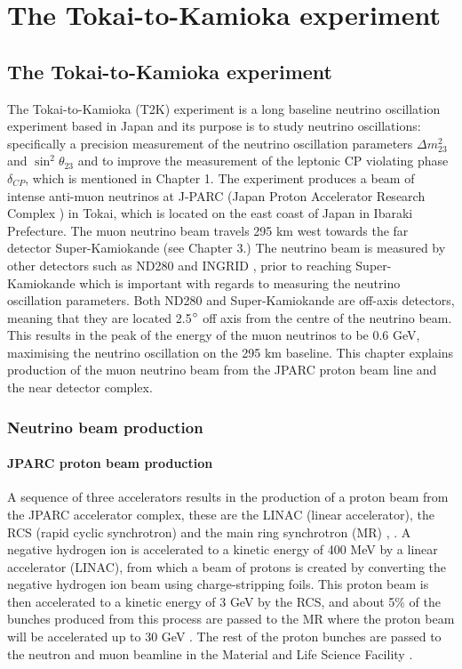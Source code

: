 \chapter{The Tokai-to-Kamioka experiment}
\label{chp:t2kdetector}

\section{The Tokai-to-Kamioka experiment}
The Tokai-to-Kamioka (T2K) experiment \cite{KANEYUKI2005178} is a long baseline neutrino oscillation experiment based in Japan and its purpose is to study neutrino oscillations: specifically a precision measurement of the neutrino oscillation parameters $\Delta m_{23}^{2}$ and $\sin ^{2} \theta_{23}$ and to improve the measurement of the leptonic CP violating phase $\delta_{CP}$, which is mentioned in Chapter 1. The experiment produces a beam of intense anti-muon neutrinos at J-PARC (Japan Proton Accelerator Research Complex \cite{nagamiya2012introduction}) in Tokai, which is located on the east coast of Japan in Ibaraki Prefecture. The muon neutrino beam travels 295 km west towards the far detector Super-Kamiokande (see Chapter 3.)  The neutrino beam is measured by other detectors such as ND280 \cite{kudenko2009near} and INGRID \cite{abe2012measurements}, prior to reaching Super-Kamiokande which is important with regards to measuring the neutrino oscillation parameters. Both ND280 and Super-Kamiokande are off-axis detectors, meaning that they are located 2.5$\degree$ off axis from the centre of the neutrino beam. This results in the peak of the energy of the muon neutrinos to be 0.6 GeV, maximising the neutrino oscillation on the 295 km baseline. This chapter explains production of the muon neutrino beam from the JPARC proton beam line and the near detector complex.


\subsection{Neutrino beam production}

\subsubsection{JPARC proton beam production}


A sequence of three accelerators results in the production of a proton beam from the JPARC accelerator complex, these are the LINAC (linear accelerator), the RCS (rapid cyclic synchrotron) and the main ring synchrotron (MR) \cite{hasegawa2010status}, \cite{sato2018high}. A negative hydrogen ion is accelerated to a kinetic energy of 400 MeV by a linear accelerator (LINAC), from which a beam of protons is created by converting the negative hydrogen ion beam using charge-stripping foils. This proton beam is then accelerated to a kinetic energy of 3 GeV by the RCS, and about 5\% of the bunches produced from this process are passed to the MR where the proton beam will be accelerated up to 30 GeV \cite{hasegawa2017performance}. The rest of the proton bunches are passed to the neutron and muon beamline in the Material and Life Science Facility \cite{higemoto2017materials}. 

